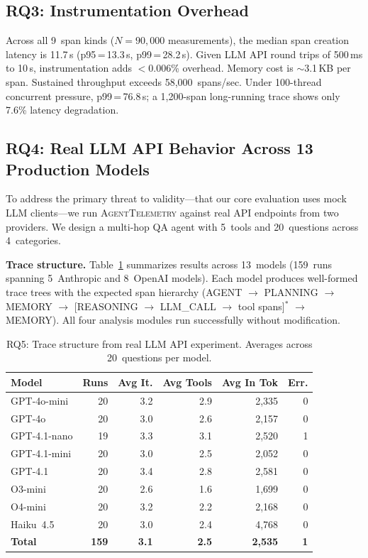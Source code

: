 \documentclass[11pt]{article}
\begin{document}
\subsection{RQ3: Instrumentation Overhead}
\label{sec:overhead}
\label{sec:rq3}

Across all 9~span kinds ($N{=}90{,}000$ measurements), the median
span creation latency is 11.7\,\textmu s (p95\,=\,13.3\,\textmu s,
p99\,=\,28.2\,\textmu s).  Given LLM API round trips of 500\,ms to
10\,s, instrumentation adds $<$0.006\% overhead.  Memory cost is
$\sim$3.1\,KB per span.  Sustained throughput exceeds
58,000~spans/sec.  Under 100-thread concurrent pressure,
p99\,=\,76.8\,\textmu s; a 1,200-span long-running trace shows only
7.6\% latency degradation.

\subsection{RQ4: Real LLM API Behavior Across 13 Production Models}
\label{sec:realllm}
\label{sec:rq5}

To address the primary threat to validity---that our core evaluation uses
mock LLM clients---we run \textsc{AgentTelemetry} against real API
endpoints from two providers.  We design a multi-hop QA agent with
5~tools and 20~questions across 4~categories.

\textbf{Trace structure.}
Table~\ref{tab:rq5-structure} summarizes results across 13~models
(159~runs spanning 5~Anthropic and 8~OpenAI models).  Each model produces well-formed trace trees with the
expected span hierarchy (AGENT $\to$ PLANNING $\to$ MEMORY $\to$
[REASONING $\to$ LLM\_CALL $\to$ tool spans]$^*$ $\to$ MEMORY).  All
four analysis modules run successfully without modification.

\begin{table}[t]
\centering
\small
\caption{RQ5: Trace structure from real LLM API experiment.
Averages across 20~questions per model.}
\label{tab:rq5-structure}
\begin{tabular}{@{}lrrrrr@{}}
\toprule
\textbf{Model} & \textbf{Runs} & \textbf{Avg It.} & \textbf{Avg Tools} & \textbf{Avg In Tok} & \textbf{Err.} \\
\midrule
GPT-4o-mini     & 20 & 3.2 & 2.9 & 2{,}335 & 0 \\
GPT-4o          & 20 & 3.0 & 2.6 & 2{,}157 & 0 \\
GPT-4.1-nano    & 19 & 3.3 & 3.1 & 2{,}520 & 1 \\
GPT-4.1-mini    & 20 & 3.0 & 2.5 & 2{,}052 & 0 \\
GPT-4.1         & 20 & 3.4 & 2.8 & 2{,}581 & 0 \\
O3-mini         & 20 & 2.6 & 1.6 & 1{,}699 & 0 \\
O4-mini         & 20 & 3.2 & 2.2 & 2{,}168 & 0 \\
Haiku~4.5       & 20 & 3.0 & 2.4 & 4{,}768 & 0 \\
\midrule
\textbf{Total}  & \textbf{159} & \textbf{3.1} & \textbf{2.5} & \textbf{2{,}535} & \textbf{1} \\
\bottomrule
\end{tabular}
\end{table}
\end{document}
